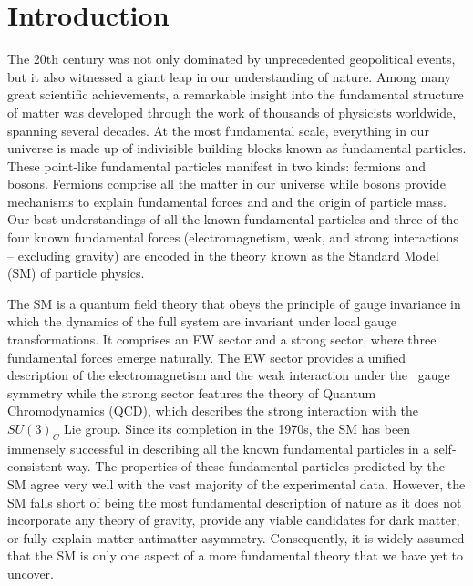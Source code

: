 \chapter{Introduction}
\label{chap:Introduction}

The 20th century was not only dominated by unprecedented geopolitical events, but it also witnessed a giant leap in our understanding of nature. Among many great scientific achievements, a remarkable insight into the fundamental structure of matter was developed through the work of thousands of physicists worldwide, spanning several decades. At the most fundamental scale, everything in our universe is made up of indivisible building blocks known as fundamental particles. These point-like fundamental particles manifest in two kinds: fermions and bosons. Fermions comprise all the matter in our universe while bosons provide mechanisms to explain fundamental forces and and the origin of particle mass. Our best understandings of all the known fundamental particles and three of the four known fundamental forces (electromagnetism, weak, and strong interactions -- excluding gravity) are encoded in the theory known as the Standard Model (\ac{SM}) of particle physics.

The \ac{SM} is a quantum field theory that obeys the principle of gauge invariance in which the dynamics of the full system are invariant under local gauge transformations. It comprises an \ac{EW} sector and a strong sector, where three fundamental forces emerge naturally. The \ac{EW} sector provides a unified description of the electromagnetism and the weak interaction under the \ew~gauge symmetry while the strong sector features the theory of Quantum Chromodynamics (\ac{QCD}), which describes the strong interaction with the $SU(3)_{C}$ Lie group. Since its completion in the 1970s, the \ac{SM} has been immensely successful in describing all the known fundamental particles in a self-consistent way. The properties of these fundamental particles predicted by the \ac{SM} agree very well with the vast majority of the experimental data. However, the \ac{SM} falls short of being the most fundamental description of nature as it does not incorporate any theory of gravity, provide any viable candidates for dark matter, or fully explain matter-antimatter asymmetry. Consequently, it is widely assumed that the \ac{SM} is only one aspect of a more fundamental theory that we have yet to uncover.

